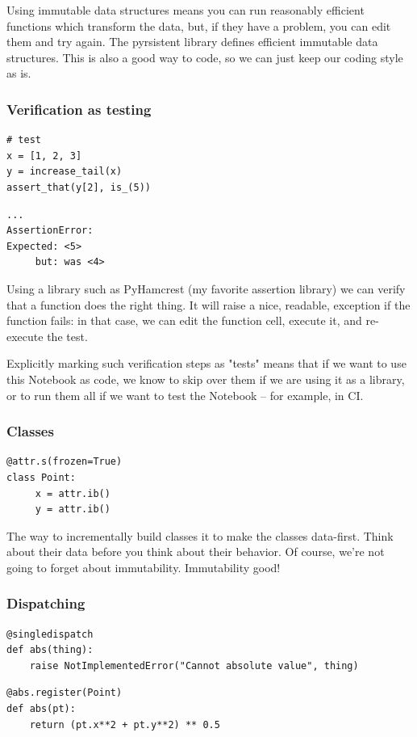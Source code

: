 Using immutable data structures means you can run
reasonably efficient functions which transform the data,
but,
if they have a problem,
you can edit them and try again.
The pyrsistent library defines efficient immutable data structures.
This is also a good way to code,
so we can just keep our coding style as is.

\begin{frame}[fragile]
\frametitle{Verification as testing}

\begin{lstlisting}[frame=single]
# test
x = [1, 2, 3]
y = increase_tail(x)
assert_that(y[2], is_(5))
\end{lstlisting}

\begin{lstlisting}[frame=single]
...
AssertionError: 
Expected: <5>
     but: was <4>
\end{lstlisting}

\end{frame}

Using a library such as PyHamcrest
(my favorite assertion library)
we can verify that a function does the right thing.
It will raise a nice,
readable,
exception if the function fails:
in that case, we can edit the function cell,
execute it,
and re-execute the test.

Explicitly marking such verification steps as "tests"
means that if we want to use this Notebook as code,
we know to skip over them if we are using it as a library,
or to run them all if we want to test the Notebook --
for example, in CI.

\begin{frame}[fragile]
\frametitle{Classes}

\begin{lstlisting}[frame=single]
@attr.s(frozen=True)
class Point:
     x = attr.ib()
     y = attr.ib()
\end{lstlisting}

\end{frame}

The way to incrementally build classes it to make the classes
data-first.
Think about their data before you think about their behavior.
Of course, we're not going to forget about immutability.
Immutability good!

\begin{frame}[fragile]
\frametitle{Dispatching}

\begin{lstlisting}[frame=single]
@singledispatch
def abs(thing):
    raise NotImplementedError("Cannot absolute value", thing)
\end{lstlisting}

\begin{lstlisting}[frame=single]
@abs.register(Point)
def abs(pt):
    return (pt.x**2 + pt.y**2) ** 0.5
\end{lstlisting}

\end{frame}

